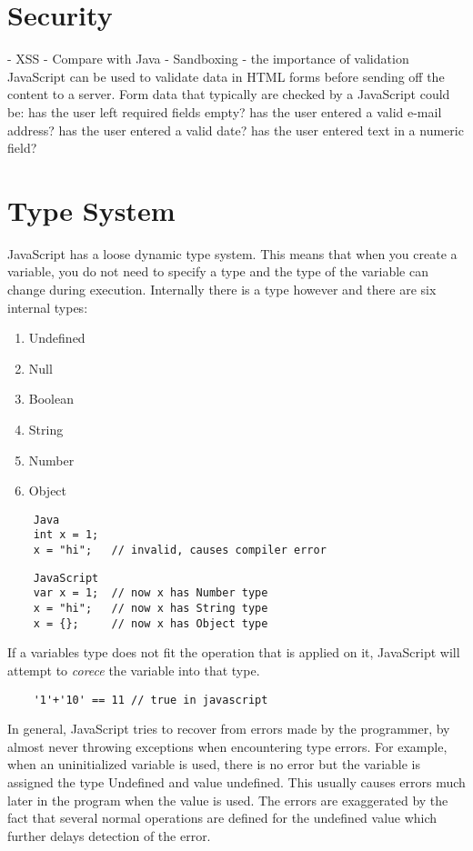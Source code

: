 \documentclass{report}
\begin{document}
\section{Security}
	- XSS
	- Compare with Java
	- Sandboxing
        - the importance of validation
JavaScript can be used to validate data in HTML forms before sending off the content to a server.
Form data that typically are checked by a JavaScript could be:
    has the user left required fields empty?
    has the user entered a valid e-mail address?
    has the user entered a valid date?
    has the user entered text in a numeric field?




\section{Type System}
	JavaScript has a loose dynamic type system. This means that when you create a variable, you do not need to specify a type and the type of the variable can change during execution. Internally there is a type however and there are six internal types:
	\begin{enumerate}
	\item Undefined
	\item Null
	\item Boolean
	\item String
	\item Number
	\item Object
	\end{enumerate}
		\begin{verbatim}
	Java
	int x = 1;
	x = "hi";   // invalid, causes compiler error
	\end{verbatim}
	\begin{verbatim}
	JavaScript
	var x = 1;  // now x has Number type
	x = "hi";   // now x has String type
	x = {};     // now x has Object type
	\end{verbatim}
	If a variables type does not fit the operation that is applied on it, JavaScript will attempt to \emph{corece} the variable into that type.
	\begin{verbatim}
	'1'+'10' == 11 // true in javascript
	\end{verbatim}
	In general, JavaScript tries to recover from errors made by the programmer, by almost never throwing exceptions when encountering type errors. For example, when an uninitialized variable is used, there is no error but the variable is assigned the type Undefined and value undefined. This usually causes errors much later in the program when the value is used. The errors are exaggerated by the fact that several normal operations are defined for the undefined value which further delays detection of the error.
\end{document}
